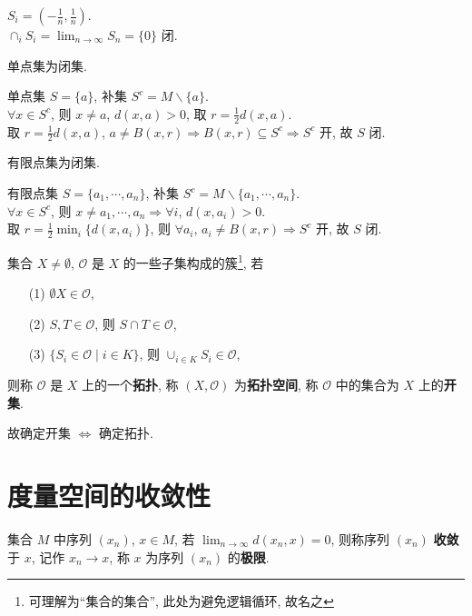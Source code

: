 \documentclass{note}
\begin{document}
\begin{eg}[无穷多个开集的交未必开]
    $S_i=\left(-\frac{1}{n},\frac{1}{n}\right)$.\\
    $\cap_iS_i=\lim_{n\rightarrow\infty}S_n=\{0\}$ 闭.
\end{eg}

单点集为闭集.
\begin{pf}
    单点集 $S=\{a\}$, 补集 $S^c=M\backslash\{a\}$.\\
    $\forall x\in S^c$, 则 $x\neq a$, $d(x,a)>0$, 取 $r=\frac{1}{2}d(x,a)$.\\
    取 $r=\frac{1}{2}d(x,a)$, $a\neq B(x,r)\Longrightarrow B(x,r)\subseteq S^c\Longrightarrow S^c$ 开, 故 $S$ 闭.
\end{pf}

有限点集为闭集.
\begin{pf}
    有限点集 $S=\{a_1,\cdots,a_n\}$, 补集 $S^{c}=M\backslash\{a_1,\cdots,a_n\}$.\\
    $\forall x\in S^c$, 则 $x\neq a_1,\cdots,a_n\Longrightarrow\forall i$, $d(x,a_i)>0$.\\
    取 $r=\frac{1}{2}\min_i\{d(x,a_i)\}$, 则 $\forall a_i$, $a_i\neq B(x,r)\Longrightarrow S^c$ 开, 故 $S$ 闭.
\end{pf}

\begin{df}[拓扑和拓扑空间]
    集合 $X\neq\emptyset$, $\mathcal{O}$ 是 $X$ 的一些子集构成的簇\footnote{可理解为``集合的集合'', 此处为避免逻辑循环, 故名之}, 若
    \begin{itemize}
        \item[(1)] $\emptyset X\in\mathcal{O}$,
        \item[(2)] $S,T\in\mathcal{O}$, 则 $S\cap T\in\mathcal{O}$,
        \item[(3)] $\{S_i\in\mathcal{O}\mid i\in K\}$, 则 $\cup_{i\in K}S_i\in\mathcal{O}$,
    \end{itemize}
    则称 $\mathcal{O}$ 是 $X$ 上的一个\textbf{拓扑}, 称 $(X,\mathcal{O})$ 为\textbf{拓扑空间}, 称 $\mathcal{O}$ 中的集合为 $X$ 上的\textbf{开集}.
\end{df}

故确定开集 $\Longleftrightarrow$ 确定拓扑.

\section{度量空间的收敛性}
\begin{df}[收敛和极限]
    集合 $M$ 中序列 $(x_n)$, $x\in M$, 若 $\lim_{n\rightarrow\infty}d(x_n,x)=0$, 则称序列 $(x_n)$ \textbf{收敛}于 $x$, 记作 $x_n\rightarrow x$, 称 $x$ 为序列 $(x_n)$ 的\textbf{极限}.
\end{df}
\end{document}
